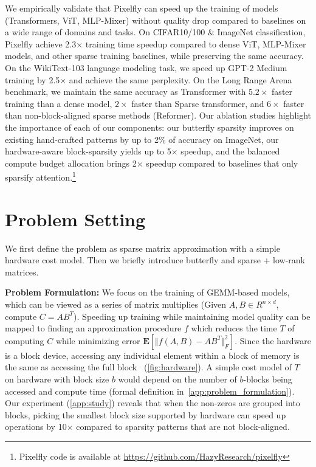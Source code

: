 We empirically validate that Pixelfly can speed up the training of models (Transformers, ViT, MLP-Mixer) without quality drop compared to baselines on a wide range of domains and tasks. On CIFAR10/100 \& ImageNet classification, Pixelfly achieve 2.3$\times$ training time speedup compared to dense ViT, MLP-Mixer models, and other sparse training baselines, while preserving the same accuracy. On the WikiText-103 language modeling task, we speed up GPT-2 Medium training by 2.5$\times$ and achieve the same perplexity. On the Long Range Arena benchmark, we maintain the same accuracy as Transformer with $5.2\times$ faster training than a dense model, $2\times$ faster than Sparse transformer, and $6\times$ faster than non-block-aligned sparse methods (Reformer). Our ablation studies highlight the importance of each of our components: our butterfly sparsity improves on existing hand-crafted patterns by up to 2\% of accuracy on ImageNet, our hardware-aware block-sparsity yields up to 5$\times$ speedup, and the balanced compute budget allocation brings 2$\times$ speedup compared to baselines that only sparsify attention.\footnote{Pixelfly code is available at \url{https://github.com/HazyResearch/pixelfly}}

\section{Problem Setting}
\label{sec:problem_formulation}
We first define the problem as sparse matrix approximation with a simple hardware cost model. Then we briefly introduce butterfly and sparse + low-rank matrices. 

\textbf{Problem Formulation:} We focus on the training of GEMM-based models, which can be viewed as a series of matrix multiplies (Given $A, B \in R^{n \times d}$, compute $C = AB^T$). Speeding up training while maintaining model quality can be mapped to finding an approximation procedure $f$ which reduces the time $T$ of computing $C$ while minimizing error $\mathbf{E}[\Vert f(A, B)-AB^T\Vert^2_F]$. Since the hardware is a block device, accessing any individual element within a block of memory is the same as accessing the full block~\citep{cook2012cuda} (\ref{fig:hardware}). A simple cost model of $T$ on hardware with block size $b$ would depend on the number of $b$-blocks being accessed and compute time (formal definition in~\ref{app:problem_formulation}).
Our experiment (\ref{app:study}) reveals that when the non-zeros are grouped into blocks, picking the smallest block size supported by hardware can speed up operations by 10$\times$ compared to sparsity patterns that are not block-aligned.

